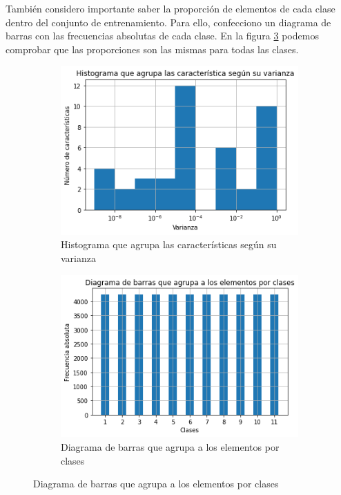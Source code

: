 \documentclass[10pt,a4paper]{article}
\begin{document}
También considero importante saber la proporción de elementos de cada clase dentro del conjunto de entrenamiento. Para ello, confecciono un diagrama de barras con las frecuencias absolutas de cada clase. En la figura \ref{fig:cla_bar} podemos comprobar que las proporciones son las mismas para todas las clases.


\begin{figure}[h]
	\begin{subfigure}{0.5\textwidth}
		\centering
		\includegraphics[width=\textwidth]{cla_hist}
		\caption{Histograma que agrupa las características según su varianza}
		\label{fig:cla_hist}
	\end{subfigure}
	\begin{subfigure}{0.5\textwidth}
		\centering
		\includegraphics[width=\textwidth]{cla_bar}
		\caption{Diagrama de barras que agrupa a los elementos por clases}
		\label{fig:cla_bar}
	\end{subfigure}
\end{figure}
\end{document}
